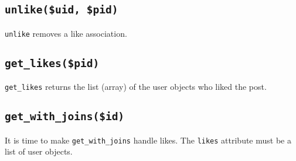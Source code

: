 \documentclass[twoside,a4paper,12pt]{article}
\begin{document}
\subsection{\texttt{unlike(\$uid, \$pid)}}
\texttt{unlike} removes a like association.

\subsection{\texttt{get\_likes(\$pid)}}
\texttt{get\_likes} returns the list (array) of the user objects who liked the post.

\subsection{\texttt{get\_with\_joins(\$id)}}
It is time to make \texttt{get\_with\_joins} handle likes. The \texttt{likes} attribute must be a list of user objects.
\end{document}

